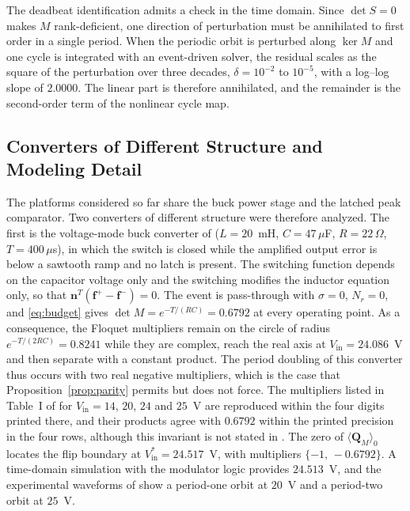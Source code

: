 \documentclass[journal]{IEEEtran}
\begin{document}
The deadbeat identification admits a check in the time domain. Since
$\det S=0$ makes $M$ rank-deficient, one direction of perturbation must be
annihilated to first order in a single period. When the periodic orbit is
perturbed along $\ker M$ and one cycle is integrated with an event-driven
solver, the residual scales as the square of the perturbation over three
decades, $\delta=10^{-2}$ to $10^{-5}$, with a log--log slope of $2.0000$.
The linear part is therefore annihilated, and the remainder is the
second-order term of the nonlinear cycle map.

\subsection{Converters of Different Structure and Modeling Detail}
\label{sec:otros}
The platforms considered so far share the buck power stage and the latched
peak comparator. Two converters of different structure were therefore
analyzed. The first is the voltage-mode buck converter of
\cite{deane1990instability,fossas1996study,giaouris2008stability}
($L=20$~mH, $C=47\,\mu$F, $R=22\,\Omega$, $T=400\,\mu$s), in which the switch
is closed while the amplified output error is below a sawtooth ramp and no
latch is present. The switching function depends on the capacitor voltage
only and the switching modifies the inductor equation only, so that
$\bm{n}^{T}(\bm{f}^{+}-\bm{f}^{-})=0$. The event is pass-through with
$\sigma=0$, $N_r=0$, and \eqref{eq:budget} gives $\det M=e^{-T/(RC)}=0.6792$
at every operating point. As a consequence, the Floquet multipliers remain
on the circle of radius $e^{-T/(2RC)}=0.8241$ while they are complex, reach
the real axis at $V_{\mathrm{in}}=24.086$~V and then separate with a constant
product. The period doubling of this converter thus occurs with two real
negative multipliers, which is the case that Proposition~\ref{prop:parity}
permits but does not force. The multipliers listed in Table~I of
\cite{giaouris2008stability} for $V_{\mathrm{in}}=14$, $20$, $24$ and $25$~V
are reproduced within the four digits printed there, and their products agree with $0.6792$ within the printed precision in the
four rows, although this invariant is not stated in
\cite{giaouris2008stability}. The zero of $\langle\bm{Q}_M\rangle_0$ locates
the flip boundary at $V_{\mathrm{in}}^{*}=24.517$~V, with multipliers
$\{-1,\,-0.6792\}$. A time-domain simulation with the modulator logic
provides $24.513$~V, and the experimental waveforms of
\cite{giaouris2008stability} show a period-one orbit at $20$~V and a
period-two orbit at $25$~V.
\end{document}
